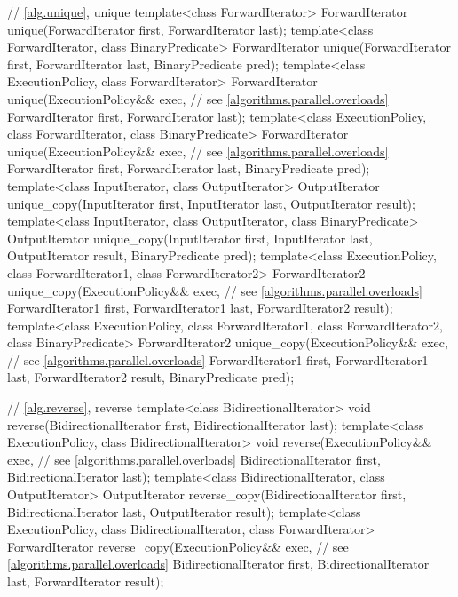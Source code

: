 \begin{codeblock}
{  // \ref{alg.unique}, unique
  template<class ForwardIterator>
    ForwardIterator unique(ForwardIterator first, ForwardIterator last);
  template<class ForwardIterator, class BinaryPredicate>
    ForwardIterator unique(ForwardIterator first, ForwardIterator last,
                           BinaryPredicate pred);
  template<class ExecutionPolicy, class ForwardIterator>
    ForwardIterator unique(ExecutionPolicy&& exec, // see \ref{algorithms.parallel.overloads}
                           ForwardIterator first, ForwardIterator last);
  template<class ExecutionPolicy, class ForwardIterator, class BinaryPredicate>
    ForwardIterator unique(ExecutionPolicy&& exec, // see \ref{algorithms.parallel.overloads}
                           ForwardIterator first, ForwardIterator last,
                           BinaryPredicate pred);
  template<class InputIterator, class OutputIterator>
    OutputIterator unique_copy(InputIterator first, InputIterator last,
                               OutputIterator result);
  template<class InputIterator, class OutputIterator, class BinaryPredicate>
    OutputIterator unique_copy(InputIterator first, InputIterator last,
                               OutputIterator result, BinaryPredicate pred);
  template<class ExecutionPolicy, class ForwardIterator1, class ForwardIterator2>
    ForwardIterator2 unique_copy(ExecutionPolicy&& exec, // see \ref{algorithms.parallel.overloads}
                                 ForwardIterator1 first, ForwardIterator1 last,
                                 ForwardIterator2 result);
  template<class ExecutionPolicy, class ForwardIterator1, class ForwardIterator2,
           class BinaryPredicate>
    ForwardIterator2 unique_copy(ExecutionPolicy&& exec, // see \ref{algorithms.parallel.overloads}
                                 ForwardIterator1 first, ForwardIterator1 last,
                                 ForwardIterator2 result, BinaryPredicate pred);

  // \ref{alg.reverse}, reverse
  template<class BidirectionalIterator>
    void reverse(BidirectionalIterator first, BidirectionalIterator last);
  template<class ExecutionPolicy, class BidirectionalIterator>
    void reverse(ExecutionPolicy&& exec, // see \ref{algorithms.parallel.overloads}
                 BidirectionalIterator first, BidirectionalIterator last);
  template<class BidirectionalIterator, class OutputIterator>
    OutputIterator reverse_copy(BidirectionalIterator first,
                                BidirectionalIterator last,
                                OutputIterator result);
  template<class ExecutionPolicy, class BidirectionalIterator, class ForwardIterator>
    ForwardIterator reverse_copy(ExecutionPolicy&& exec, // see \ref{algorithms.parallel.overloads}
                                 BidirectionalIterator first,
                                 BidirectionalIterator last,
                                 ForwardIterator result);

}
\end{codeblock}
